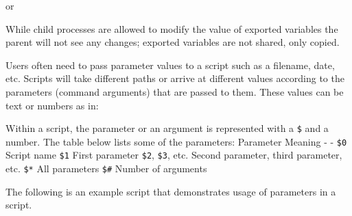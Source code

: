 or

\begin{Shaded}
\begin{Highlighting}[]
 
\end{Highlighting}
\end{Shaded}

While child processes are allowed to modify the value of exported
variables the parent will not see any changes; exported variables are
not shared, only copied.

Users often need to pass parameter values to a script such as a
filename, date, etc. Scripts will take different paths or arrive at
different values according to the parameters (command arguments) that
are passed to them. These values can be text or numbers as in:

\begin{Shaded}
\begin{Highlighting}[]
\NormalTok{$ } 
\NormalTok{$ } 
\end{Highlighting}
\end{Shaded}

Within a script, the parameter or an argument is represented with a
\texttt{\$} and a number. The table below lists some of the parameters:
Parameter \textbar{} Meaning - \textbar{} - \texttt{\$0} \textbar{}
Script name \texttt{\$1} \textbar{} First parameter \texttt{\$2},
\texttt{\$3}, etc. \textbar{} Second parameter, third parameter, etc.
\texttt{\$*} \textbar{} All parameters \texttt{\$\#} \textbar{} Number
of arguments

The following is an example script that demonstrates usage of parameters
in a script.

\begin{Shaded}
\begin{Highlighting}[]
 
 
 
 
 \OtherTok{$*}
 
\end{Highlighting}
\end{Shaded}

